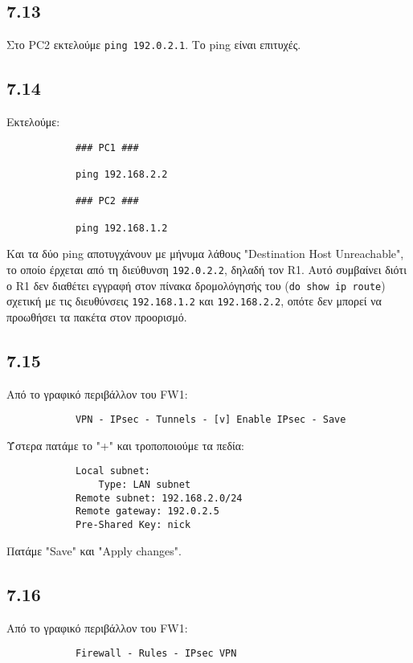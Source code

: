 \documentclass[a4paper, 12pt]{article}
\begin{document}
	\subsection*{7.13}
		Στο PC2 εκτελούμε \verb|ping 192.0.2.1|. Το ping είναι επιτυχές.

	\subsection*{7.14}
		Εκτελούμε:
		
		\begin{verbatim}
			### PC1 ###
			
			ping 192.168.2.2
			
			### PC2 ###
			
			ping 192.168.1.2
		\end{verbatim}
		
		Και τα δύο ping αποτυγχάνουν με μήνυμα λάθους "Destination Host Unreachable", το οποίο έρχεται από τη διεύθυνση \verb|192.0.2.2|, δηλαδή τον R1. Αυτό συμβαίνει διότι ο R1 δεν διαθέτει εγγραφή στον πίνακα δρομολόγησής του (\verb|do show ip route|) σχετική με τις διευθύνσεις \verb|192.168.1.2| και \verb|192.168.2.2|, οπότε δεν μπορεί να προωθήσει τα πακέτα στον προορισμό.

	\subsection*{7.15}
		Από το γραφικό περιβάλλον του FW1:
		
		\begin{verbatim}
			VPN - IPsec - Tunnels - [v] Enable IPsec - Save
		\end{verbatim}
		
		Ύστερα πατάμε το "+" και τροποποιούμε τα πεδία:
		
		\begin{verbatim}
			Local subnet:
			    Type: LAN subnet
			Remote subnet: 192.168.2.0/24
			Remote gateway: 192.0.2.5
			Pre-Shared Key: nick
		\end{verbatim}
		
		Πατάμε "Save" και "Apply changes".

	\subsection*{7.16}
		Από το γραφικό περιβάλλον του FW1:
		
		\begin{verbatim}
			Firewall - Rules - IPsec VPN
		\end{verbatim}
		
\end{document}
